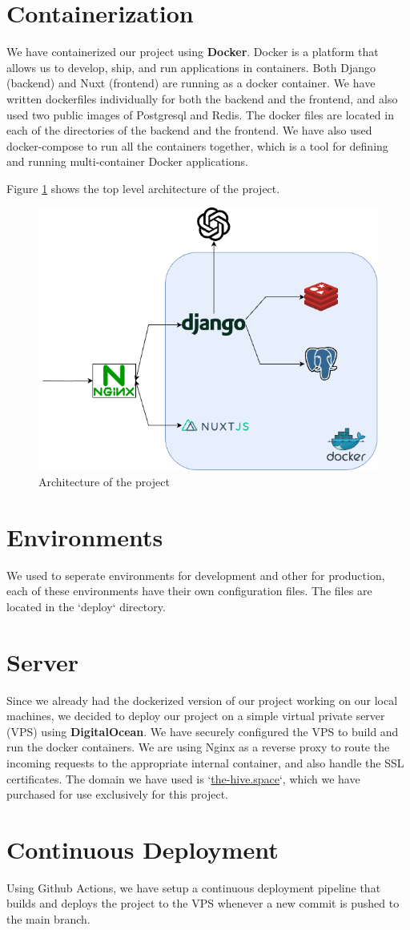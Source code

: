 \section{Containerization}
We have containerized our project using \textbf{Docker}. Docker is a platform that allows us to develop, ship, and run applications in containers.
Both Django (backend) and Nuxt (frontend) are running as a docker container.
We have written dockerfiles individually for both the backend and the frontend, and also used two public images of Postgresql and Redis.
The docker files are located in each of the directories of the backend and the frontend.
We have also used docker-compose to run all the containers together, which is a tool for defining and running multi-container Docker applications.

Figure \ref{fig:architecture} shows the top level architecture of the project.

\begin{figure}[htbp]
    \centering
    \includegraphics[width=0.4\linewidth]{img/infra.png}
    \caption{Architecture of the project}
    \label{fig:architecture}
\end{figure}

\section{Environments}
We used to seperate environments for development and other for production, each of these environments have their own configuration files.
The files are located in the `deploy` directory.


\section{Server}
Since we already had the dockerized version of our project working on our local machines, we decided to deploy our project on a simple virtual private server (VPS) using \textbf{DigitalOcean}.
We have securely configured the VPS to build and run the docker containers.
We are using Nginx as a reverse proxy to route the incoming requests to the appropriate internal container, and also handle the SSL certificates.
The domain we have used is `\url{the-hive.space}`, which we have purchased for use exclusively for this project.

\section{Continuous Deployment}
Using Github Actions, we have setup a continuous deployment pipeline that builds and deploys the project to the VPS whenever a new commit is pushed to the main branch.
